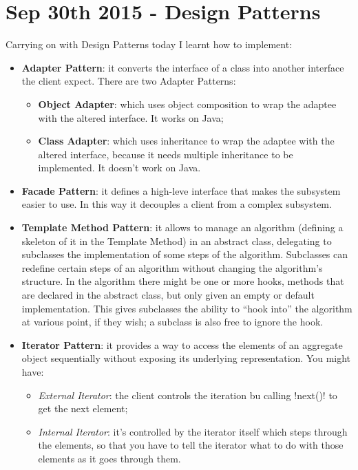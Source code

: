 \section{Sep 30th 2015 - Design Patterns}

Carrying on with Design Patterns today I learnt how to implement:

\begin{itemize}
\item \textbf{Adapter Pattern}: it converts the interface of a class
  into another interface the client expect. There are two Adapter
  Patterns:
  \begin{itemize}
  \item \textbf{Object Adapter}: which uses object composition to wrap
    the adaptee with the altered interface. It works on Java;
  \item \textbf{Class Adapter}: which uses inheritance to wrap the
    adaptee with the altered interface, because it needs multiple
    inheritance to be implemented. It doesn't work on Java.
  \end{itemize}
\item \textbf{Facade Pattern}: it defines a high-leve interface that
  makes the subsystem easier to use. In this way it decouples a client
  from a complex subsystem.
\item \textbf{Template Method Pattern}: it allows to manage an
  algorithm (defining a skeleton of it in the Template Method) in an
  abstract class, delegating to subclasses the implementation of some
  steps of the algorithm. Subclasses can redefine certain steps of an
  algorithm without changing the algorithm's structure. In the
  algorithm there might be one or more hooks, methods that are
  declared in the abstract class, but only given an empty or default
  implementation. This gives subclasses the ability to ``hook into''
  the algorithm at various point, if they wish; a subclass is also
  free to ignore the hook.
\item \textbf{Iterator Pattern}: it provides a way to access the
  elements of an aggregate object sequentially without exposing its
  underlying representation. You might have:
  \begin{itemize}
  \item \textit{External Iterator}: the client controls the iteration
    bu calling \inline!next()! to get the next element;
  \item \textit{Internal Iterator}: it's controlled by the iterator
    itself which steps through the elements, so that you have to tell
    the iterator what to do with those elements as it goes through
    them.
  \end{itemize}
\end{itemize}
